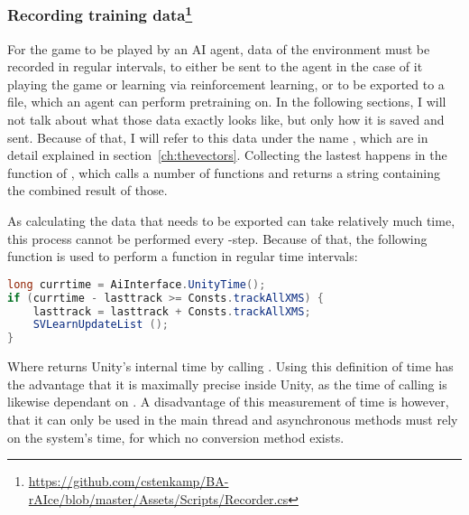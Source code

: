 \subsubsection{Recording training data\footnote{\url{https://github.com/cstenkamp/BA-rAIce/blob/master/Assets/Scripts/Recorder.cs}}}

\label{sec:exportdata}

For the game to be played by an AI agent, data of the environment must be recorded in regular intervals, to either be sent to the agent in the case of it playing the game or learning via reinforcement learning, or to be exported to a file, which an agent can perform pretraining on. In the following sections, I will not talk about what those data exactly looks like, but only how it is saved and sent. Because of that, I will refer to this data under the name , which are in detail explained in section~\ref{ch:thevectors}. Collecting the lastest  happens in the function  of , which calls a number of functions and returns a string containing the combined result of those.

As calculating the data that needs to be exported can take relatively much time, this process cannot be performed every -step. Because of that, the following function is used to perform a function in regular time intervals:
\begin{lstlisting}[language=C#, style=CSharp, frame=none]
long currtime = AiInterface.UnityTime();
if (currtime - lasttrack >= Consts.trackAllXMS) {
	lasttrack = lasttrack + Consts.trackAllXMS; 
	SVLearnUpdateList ();
}
\end{lstlisting}%

Where  returns Unity's internal time by calling . Using this definition of time has the advantage that it is maximally precise inside Unity, as the time of calling  is likewise dependant on . A disadvantage of this measurement of time is however, that it can only be used in the main thread and asynchronous methods must rely on the system's time, for which no conversion method exists.

